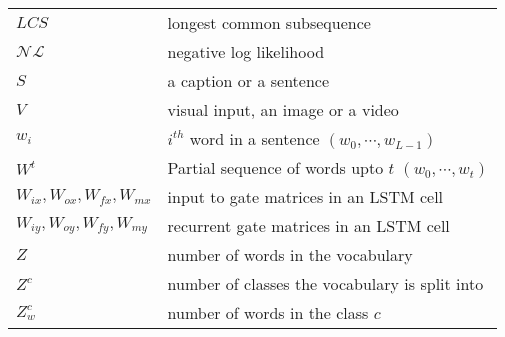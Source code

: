 \begin{longtable}{@{}p{}p{}@{}}
        $LCS$   & longest common subsequence\\
        $\mathcal{NL}$ & negative log likelihood \\
        $S$ & a caption or a sentence\\
        $V$   & visual input, an image or a video\\
        $w_i$   & $i^{th}$ word in a sentence $(w_0,\cdots,w_{L-1})$\\
        $W^t$ & Partial sequence of words upto $t$ $(w_0,\cdots,w_t)$\\
        $W_{ix},W_{ox},W_{fx}, W_{mx}$ & input to gate matrices in an LSTM cell \\
        $W_{iy},W_{oy},W_{fy}, W_{my}$ & recurrent gate matrices in an LSTM cell \\
        $Z$   &  number of words in the vocabulary\\
        $Z^c$   & number of classes the vocabulary is split into\\
        $Z_w^c$   & number of words in the class $c$\\

\end{longtable}
\endgroup

